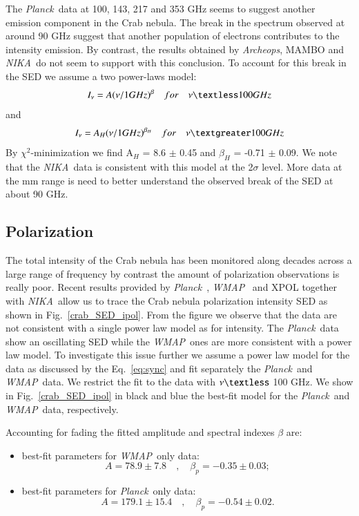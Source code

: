 \documentclass[twocolumn,traditabstract]{aa}
\def\NIKA{\textit{NIKA}}
\def\Planck{\textit{Planck}}
\def\WMAP{\textit{WMAP}}
\begin{document}
The \Planck\ data at 100, 143, 217 and 353 GHz seems to suggest another emission component in the Crab nebula. The break in the spectrum observed at around 90 GHz   suggest that another population of electrons contributes to the intensity emission. By contrast,  the results obtained by {\it Archeops}, MAMBO and \NIKA\ do not seem to support with this conclusion. 
To account for this break in the SED we assume a two power-laws model:
\begin{equation}
I_{\nu} = A(\nu/1GHz)^{\beta} \quad for \quad \nu   \textless  100 GHz
\end{equation}
and 
\begin{equation}
I_{\nu} = A_{H}(\nu/1GHz)^{\beta_H} \quad for \quad \nu   \textgreater  100 GHz
\end{equation}
By $\chi^2$-minimization we find
A$_H$ = 8.6 $\pm$ 0.45 and $\beta_H$ = -0.71 $\pm$ 0.09.
We note that the \NIKA\ data is consistent with this model at the 2$\sigma$ level. More data at the mm range is need to better understand the observed break of the SED at about 90 GHz. 


\subsection{Polarization}
The total intensity of the Crab nebula has been monitored along decades across a large range of frequency by contrast the amount of polarization observations is really poor.
Recent results provided by \Planck\ \citep{2015arXiv150702058P}, \WMAP\ \citep{2011ApJS..192...19W} and XPOL \citep{aumont2010} together with \NIKA\ allow us to trace the Crab nebula polarization intensity SED as shown in Fig.~\ref{crab_SED_ipol}. 
From the figure we observe that the data are not consistent with a single power law model as for intensity. 
The \Planck\ data show an oscillating SED while the \WMAP\ ones are more consistent with a power law model.
To investigate this issue further we assume a power law model for the data as discussed by the Eq.~\ref{eq:sync} and fit separately the \Planck\ and \WMAP\ data.
We restrict the fit to the data with $\nu \textless$ 100 GHz. We show in Fig.~\ref{crab_SED_ipol} in black and blue the best-fit model for the \Planck\ and \WMAP\ data, respectively.

Accounting for fading the fitted amplitude and spectral indexes $\beta$ are:
\begin{itemize}
\item best-fit parameters for \WMAP\ only data:
\begin{equation}
A = 78.9\pm7.8 \quad , \quad \beta_p = -0.35\pm0.03;
\end{equation}
\item best-fit parameters for \Planck\ only data:
\begin{equation}
A = 179.1\pm15.4 \quad , \quad \beta_p = -0.54\pm0.02.
\end{equation}
\end{itemize}
\end{document}
